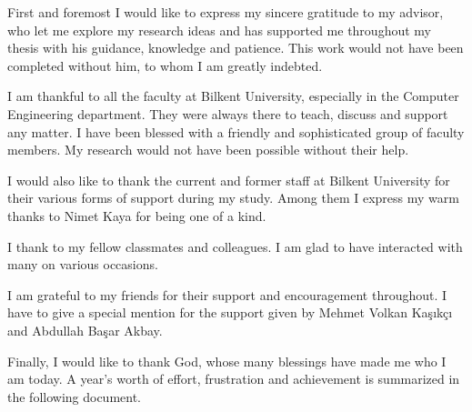 \begin{ack}
First and foremost I would like to express my sincere gratitude to my advisor, 
who let me explore my research ideas and has supported me throughout my 
thesis with his guidance, knowledge and patience. This work would not have 
been completed without him, to whom I am greatly indebted.

I am thankful to all the faculty at Bilkent University, especially in the Computer 
Engineering department. They were always there to teach, discuss and 
support any matter. I have been blessed with a friendly and sophisticated 
group of faculty members. My research would not have been possible 
without their help.

I would also like to thank the current and former staff at Bilkent University 
for their various forms of support during my study. Among them I express 
my warm thanks to Nimet Kaya for being one of a kind.

I thank to my fellow classmates and colleagues. I am glad to have 
interacted with many on various occasions.

I am grateful to my friends for their support and encouragement throughout. 
I have to give a special mention for the support given by Mehmet Volkan 
Ka\c{s}{\i}k\c{c}{\i} and Abdullah Ba\c{s}ar Akbay.

Finally, I would like to thank God, whose many blessings have made me 
who I am today. A year's worth of effort, frustration and achievement is 
summarized in the following document.
\end{ack}